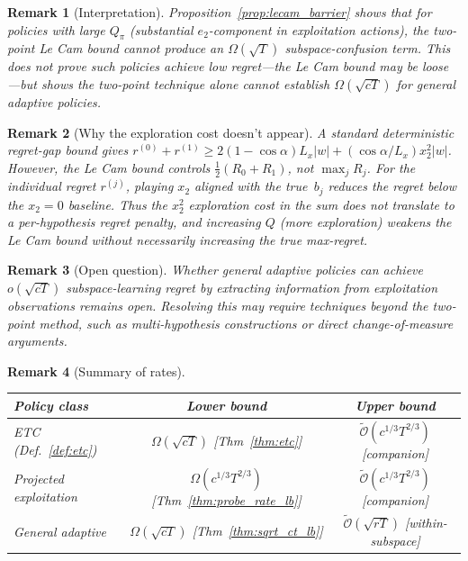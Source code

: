 \documentclass[12pt]{article}
\newcommand{\tilO}{\widetilde{\mathcal{O}}}
\newtheorem{remark}{Remark}
\theoremstyle{plain}
\theoremstyle{definition}
\begin{document}
\begin{remark}[Interpretation]
\label{rem:lecam_interp}
Proposition~\ref{prop:lecam_barrier} shows that for policies with large $Q_\pi$ (substantial $e_2$-component in exploitation actions), the two-point Le Cam bound cannot produce an $\Omega(\sqrt{T})$ subspace-confusion term. This does not prove such policies achieve low regret---the Le Cam bound may be loose---but shows the two-point technique alone cannot establish $\Omega(\sqrt{cT})$ for general adaptive policies.
\end{remark}

\begin{remark}[Why the exploration cost doesn't appear]
\label{rem:exploration}
A standard deterministic regret-gap bound gives
$r^{(0)}+r^{(1)} \ge 2(1-\cos\alpha)L_x|w|+(\cos\alpha/L_x)x_2^2|w|$.
However, the Le Cam bound controls $\frac{1}{2}(R_0+R_1)$,
not $\max_j R_j$.  For the \emph{individual} regret $r^{(j)}$, playing
$x_2$ aligned with the true~$b_j$ \emph{reduces} the regret below the
$x_2=0$ baseline.  Thus the $x_2^2$ exploration cost in the sum does not
translate to a per-hypothesis regret penalty, and increasing $Q$ (more
exploration) weakens the Le Cam bound without necessarily increasing the
true max-regret.
\end{remark}

\begin{remark}[Open question]
\label{rem:open_adaptive}
Whether general adaptive policies can achieve $o(\sqrt{cT})$ subspace-learning regret by extracting information from exploitation observations remains open. Resolving this may require techniques beyond the two-point method, such as multi-hypothesis constructions or direct change-of-measure arguments.
\end{remark}

\begin{remark}[Summary of rates]
\label{rem:rate_summary}
\begin{center}
\begin{tabular}{lcc}
\toprule
\textbf{Policy class} & \textbf{Lower bound} & \textbf{Upper bound} \\
\midrule
ETC (Def.~\ref{def:etc}) & $\Omega(\sqrt{cT})$ [Thm~\ref{thm:etc}] & $\tilO(c^{1/3}T^{2/3})$ [companion] \\
Projected exploitation & $\Omega(c^{1/3}T^{2/3})$ [Thm~\ref{thm:probe_rate_lb}] & $\tilO(c^{1/3}T^{2/3})$ [companion] \\
General adaptive & $\Omega(\sqrt{cT})$ [Thm~\ref{thm:sqrt_ct_lb}] & $\tilO(\sqrt{rT})$ [within-subspace] \\
\bottomrule
\end{tabular}
\end{center}
\end{remark}
\end{document}
